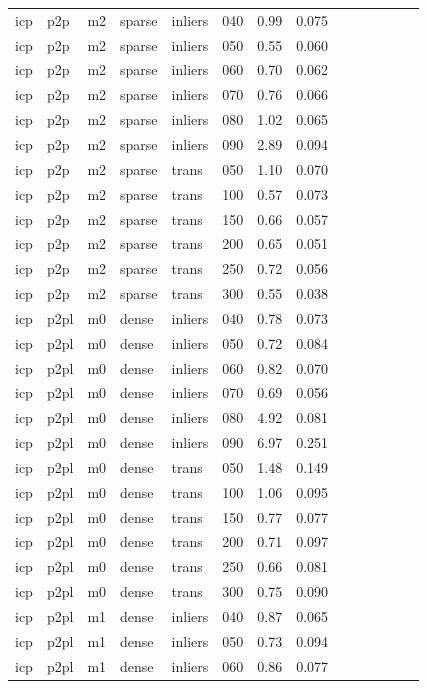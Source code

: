 \begin{table}[htbp]
\begin{tabular}{llllllrrrrrrrr}
  icp & p2p & m2 & sparse & inliers & 040 & 0.99 & 0.075 \\
  icp & p2p & m2 & sparse & inliers & 050 & 0.55 & 0.060 \\
  icp & p2p & m2 & sparse & inliers & 060 & 0.70 & 0.062 \\
  icp & p2p & m2 & sparse & inliers & 070 & 0.76 & 0.066 \\
  icp & p2p & m2 & sparse & inliers & 080 & 1.02 & 0.065 \\
  icp & p2p & m2 & sparse & inliers & 090 & 2.89 & 0.094 \\
  icp & p2p & m2 & sparse & trans & 050 & 1.10 & 0.070 \\
  icp & p2p & m2 & sparse & trans & 100 & 0.57 & 0.073 \\
  icp & p2p & m2 & sparse & trans & 150 & 0.66 & 0.057 \\
  icp & p2p & m2 & sparse & trans & 200 & 0.65 & 0.051 \\
  icp & p2p & m2 & sparse & trans & 250 & 0.72 & 0.056 \\
  icp & p2p & m2 & sparse & trans & 300 & 0.55 & 0.038 \\
  icp & p2pl & m0 & dense & inliers & 040 & 0.78 & 0.073 \\
  icp & p2pl & m0 & dense & inliers & 050 & 0.72 & 0.084 \\
  icp & p2pl & m0 & dense & inliers & 060 & 0.82 & 0.070 \\
  icp & p2pl & m0 & dense & inliers & 070 & 0.69 & 0.056 \\
  icp & p2pl & m0 & dense & inliers & 080 & 4.92 & 0.081 \\
  icp & p2pl & m0 & dense & inliers & 090 & 6.97 & 0.251 \\
  icp & p2pl & m0 & dense & trans & 050 & 1.48 & 0.149 \\
  icp & p2pl & m0 & dense & trans & 100 & 1.06 & 0.095 \\
  icp & p2pl & m0 & dense & trans & 150 & 0.77 & 0.077 \\
  icp & p2pl & m0 & dense & trans & 200 & 0.71 & 0.097 \\
  icp & p2pl & m0 & dense & trans & 250 & 0.66 & 0.081 \\
  icp & p2pl & m0 & dense & trans & 300 & 0.75 & 0.090 \\
  icp & p2pl & m1 & dense & inliers & 040 & 0.87 & 0.065 \\
  icp & p2pl & m1 & dense & inliers & 050 & 0.73 & 0.094 \\
  icp & p2pl & m1 & dense & inliers & 060 & 0.86 & 0.077 \\

\end{tabular}
\end{table}
